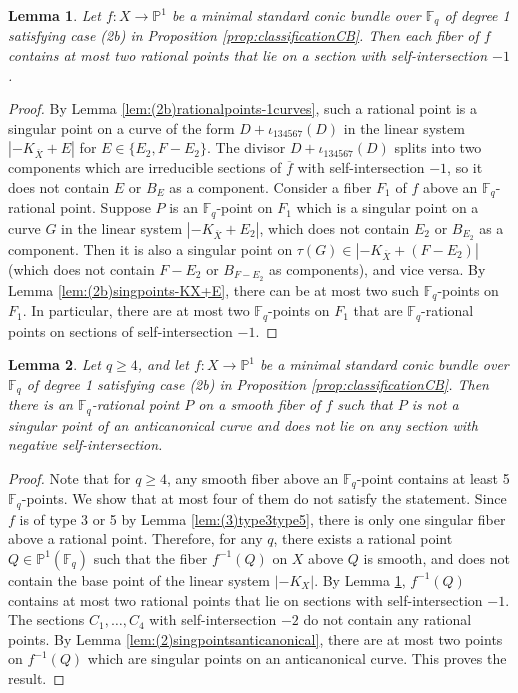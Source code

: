 \documentclass[a4paper, 11pt, reqno]{amsart}
\numberwithin{equation}{section} \numberwithin{figure}{section}
\def \F {{\mathbb F}}
\def \P {{\mathbb P}}
\newcommand{\ra}{\rightarrow}
\newtheorem{lemma}{Lemma}
\theoremstyle{definition}
\numberwithin{lemma}{section}
\begin{document}
\begin{lemma}\label{lem:(2b)atmost2ptsonnegativesection}
    Let $f \colon X \ra \P^1$ be a minimal standard conic bundle over $\F_q$ of degree 1  satisfying case (2b) in Proposition \ref{prop:classificationCB}. Then each fiber of $f$ contains at most two rational points that lie on a section with self-intersection $-1$.
\end{lemma}

\begin{proof}
    By Lemma \ref{lem:(2b)rationalpoints-1curves}, such a rational point is a singular point on a curve of the form $D + \iota_{134567}(D)$ in the linear system $|-K_{\overline{X}} + E|$ for $E \in \{E_2, F - E_2\}$. The divisor $D + \iota_{134567}(D)$ splits into two components which are irreducible sections of $\overline{f}$ with self-intersection $-1$, so it does not contain $E$ or $B_E$ as a component. Consider a fiber $F_1$ of $f$ above an $\F_q$-rational point. Suppose $P$ is an $\F_q$-point on $F_1$ which is a singular point on a curve $G$ in the linear system $|-K_{\overline{X}} + E_2|$, which does not contain $E_2$ or $B_{E_2}$ as a component. Then it is also a singular point on $\tau(G) \in |-K_{\overline{X}} + (F - E_2)|$ (which does not contain $F - E_2$ or $B_{F- E_2}$ as components), and vice versa. By Lemma \ref{lem:(2b)singpoints-KX+E}, there can be at most two such $\F_q$-points on $F_1$. In particular, there are at most two $\F_q$-points on $F_1$ that are $\F_q$-rational points on sections of self-intersection $-1$.
\end{proof}


\begin{lemma}\label{lem:(3)existencepointonfiber}
    Let $q \geq 4$, and let $f \colon X \ra \P^1$ be a minimal standard conic bundle over $\F_q$ of degree 1 satisfying case (2b) in Proposition \ref{prop:classificationCB}. Then there is an $\F_q$-rational point $P$ on a smooth fiber of $f$ such that $P$ is not a singular point of an anticanonical curve and does not lie on any section with negative self-intersection.
\end{lemma}

\begin{proof}
    Note that for $q \geq 4$, any smooth fiber above an $\F_q$-point contains at least 5 $\F_q$-points. We show that at most four of them do not satisfy the statement. Since $f$ is of type 3 or 5 by Lemma \ref{lem:(3)type3type5}, there is only one singular fiber above a rational point. Therefore, for any $q$, there exists a rational point $Q \in \P^1(\F_q)$ such that the fiber $f^{-1}(Q)$ on $X$ above $Q$ is smooth, and does not contain the base point of the linear system $|-K_X|$. By Lemma \ref{lem:(2b)atmost2ptsonnegativesection}, $f^{-1}(Q)$ contains at most two rational points that lie on sections with self-intersection $-1$. The sections $C_1, \ldots, C_4$ with self-intersection $-2$ do not contain any rational points. By Lemma \ref{lem:(2)singpointsanticanonical}, there are at most two points on $f^{-1}(Q)$ which are singular points on an anticanonical curve. This proves the result.
\end{proof}
\end{document}
